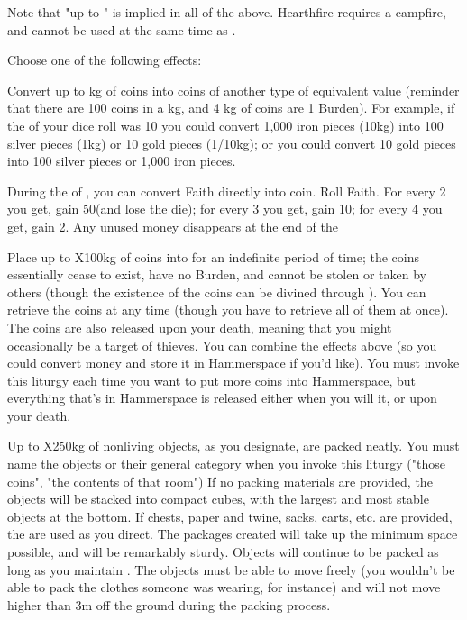 \begin{multicols*}{2}
Note that "up to \MAX" is implied in all of the above. Hearthfire requires a campfire, and cannot be used at the same time as .

\LITURGY [
  Name = Lay Assistance,
  Link = arcana-mystery-lay-assistance,
  Paradigm = Civilized,
  Duration = See Below
]

Choose one of the following effects:

  Convert up to \SUMDICE kg of coins into coins of another type of equivalent value (reminder that there are 100 coins in a kg, and 4 kg of coins are 1 Burden). For example, if the \SUMDICE of your dice roll was 10 you could convert 1,000 iron pieces (10kg) into 100 silver pieces (1kg) or 10 gold pieces (1/10kg); or you could convert 10 gold pieces into 100 silver pieces or 1,000 iron pieces. 

 During the  of , you can convert Faith directly into coin.  Roll \DICE Faith.  For every 2 you get, gain 50\FE (and lose the die); for every 3 you get, gain 10\AG; for every 4 you get, gain 2\AU. Any unused money disappears at the end of the 

 Place up to \DICE X100kg of coins into  for an indefinite period of time; the coins essentially cease to exist, have no Burden, and cannot be stolen or taken by others (though the existence of the coins can be divined through ).  You can retrieve the coins at any time (though you have to retrieve all of them at once).  The coins are also released upon your death, meaning that you might occasionally be a target of thieves. You can combine the effects above (so you could convert money and store it in Hammerspace if you'd like).  You must invoke this liturgy each time you want to put more coins into Hammerspace, but everything that's in Hammerspace is released either when you will it, or upon your death.

 Up to \DICE X250kg of nonliving objects, as you designate, are packed neatly. You must name the objects or their general category when you invoke this liturgy ("those coins", "the contents of that room") If no packing materials are provided, the objects will be stacked into compact cubes, with the largest and most stable objects at the bottom. If chests, paper and twine, sacks, carts, etc. are provided, the are used as you direct. The packages created will take up the minimum space possible, and will be remarkably sturdy. Objects will continue to be packed as long as you maintain . The objects must be able to move freely (you wouldn't be able to pack the clothes someone was wearing, for instance) and will not move higher than 3m off the ground during the packing process. 


\end{multicols*}
